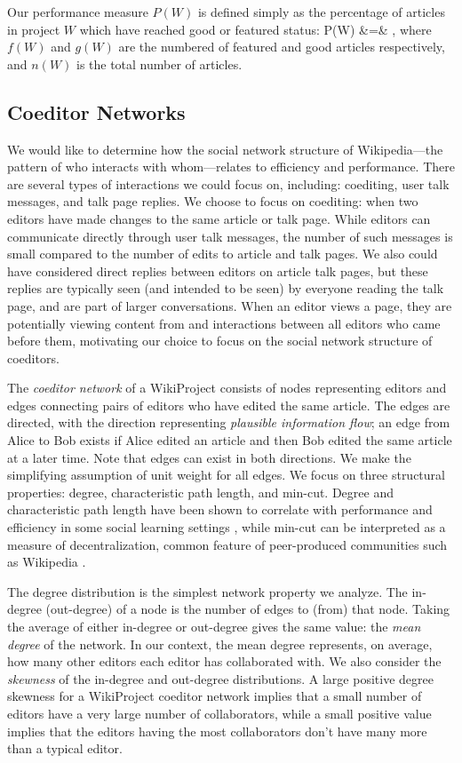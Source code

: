 Our performance measure $P(W)$ is defined simply as
the percentage of articles in project $W$ which have reached
good or featured status:
\beq
P(W) &=& ,
\eeq
where $f(W)$ and $g(W)$ are the numbered of featured and good articles respectively,
and $n(W)$ is the total number of articles.

\subsection{Coeditor Networks}

We would like to determine how the social network structure of
Wikipedia---the pattern of who interacts with whom---relates to
efficiency and performance.
There are several types of interactions we could focus on,
including:
coediting, user talk messages, and talk page replies.
We choose to focus on coediting: when two editors have made changes to the
same article or talk page.
While editors can communicate directly through user talk messages,
the number of such messages is small compared to the number of edits to article
and talk pages.
We also could have considered direct replies between editors on article talk
pages, but these replies are typically seen (and intended to be seen)
by everyone reading the talk page,
and are part of larger conversations.
When an editor views a page,
they are potentially viewing content from and interactions
between all editors who came before them,
motivating our choice to focus on the social network structure of
coeditors.

The {\em coeditor network} of a WikiProject consists of nodes representing editors
and edges connecting pairs of editors who have edited the same article.
The edges are directed, with the direction representing
{\em plausible information flow};
an edge from Alice to Bob exists if Alice edited an article and then Bob edited the same article at
a later time. Note that edges can exist in both directions. 
We make the simplifying assumption of unit weight for all edges.
We focus on three structural properties:
degree, characteristic path length, and min-cut.
Degree and characteristic path length have been shown to correlate with
performance and efficiency in some social learning settings
\cite{golub_naive_2010,mason_propagation_2008,grim_scientific_2013},
while min-cut can be interpreted as a measure of decentralization,
common feature of peer-produced communities such as Wikipedia
\cite{benkler_wealth_2006}.

The degree distribution is the simplest network property we analyze.
The in-degree (out-degree) of a node is the number of edges to (from) that node.
Taking the average of either in-degree or out-degree gives the same value:
the {\em mean degree} of the network.
In our context, the mean degree represents, on average,
how many other editors each editor has collaborated with.
We also consider the {\em skewness} of the in-degree and out-degree distributions.
A large positive degree skewness for a WikiProject coeditor network
implies that a small number of editors have a very large number of collaborators,
while a small positive value implies that the editors having the most collaborators
don't have many more than a typical editor.

